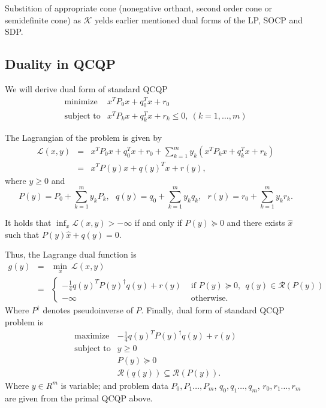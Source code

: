 \documentclass[10pt,oneside]{book}
\theoremstyle{definition}
\begin{document}
Substition of appropriate cone (nonegative orthant, second order cone or semidefinite cone) as $\mathcal{K}$ yelds earlier mentioned dual forms of the LP, SOCP and SDP.


\subsection{Duality in QCQP}

We will derive dual form of standard QCQP
\begin{equation}
\begin{array}{ll}
\mbox{minimize}& x^TP_0x + q_0^Tx + r_0 \\
\mbox{subject to}& x^TP_kx + q_k^Tx + r_k \leq 0, \  (k = 1,\dots ,m)
\end{array} 
\end{equation}

The Lagrangian of the problem is given by
\begin{eqnarray}
\mathcal{L}(x,y) &=&  x^TP_0x + q_0^Tx + r_0 + \sum_{k=1}^m y_k(x^TP_kx + q_k^Tx + r_k) \\
 &=& x^TP(y)x + q(y)^Tx + r(y),
\end{eqnarray}
where $y\geq 0$ and
\begin{equation} 
P(y) = P_0 + \sum_{k = 1}^m y_kP_k, \ \ \  q(y) = q_0 + \sum_{k = 1}^m y_kq_k, \ \ \ r(y) = r_0 + \sum_{k =1}^m y_kr_k. 
\end{equation}

It holds that $\inf_x\mathcal{L}(x,y) > -\infty$ if and only if $P(y)\succeq 0$ and there exists $\hat{x}$ such that  $P(y)\hat{x} + q(y) = 0.$

Thus, the Lagrange dual function is 
\begin{eqnarray}
g(y) &=& \min_x \ \mathcal{L}(x,y) \\
&=& \left\lbrace \begin{array}{ll} 
-\frac{1}{4}q(y)^TP(y)^{\dagger}q(y) + r(y) & \mbox{ if } P(y)\succeq 0,\ \ q(y)\in\mathcal{R}(P(y))\\ 
-\infty & \mbox{ otherwise.}
\end{array}\right. 
\end{eqnarray}
Where $P^\dagger$ denotes pseudoinverse of $P$.
Finally, dual form of standard QCQP problem is 
\begin{equation}
\label{QCQD} 
\begin{array}{ll}
\mbox{maximize} & -\frac{1}{4}q(y)^TP(y)^{\dagger}q(y) + r(y) \\
\mbox{subject to}&  y \geq 0\\
& P(y )\succeq 0 \\
& \mathcal{R}(q(y)) \subseteq \mathcal{R}(P(y)).
\end{array} 
\tag{QCQP Dual}
\end{equation}
Where $y\in R^m$ is variable; and problem data $P_0,P_1\dots ,P_m$, $q_0,q_1\dots ,q_m$, $r_0,r_1\dots , r_m$ are given from the primal QCQP above.
\end{document}
